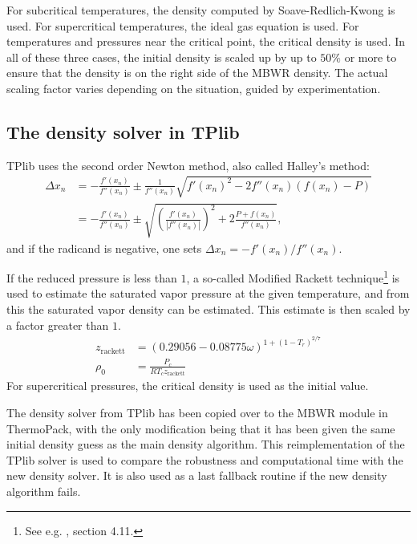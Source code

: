 \documentclass[english]{../thermomemo/thermomemo}
\newcommand{\lp}{\left(}
\newcommand{\rp}{\right)}
\numberwithin{equation}{section}
\begin{document}
For subcritical temperatures, the density computed by
Soave-Redlich-Kwong is used. For supercritical temperatures, the ideal
gas equation is used. For temperatures and pressures near the critical
point, the critical density is used. In all of these three cases, the
initial density is scaled up by up to $50\%$ or more to ensure that the density is on the right side of the MBWR density. The actual scaling factor varies depending on the situation, guided by experimentation.

\subsection{The density solver in TPlib} \label{tplibSolver}
TPlib uses the second order Newton method, also called Halley's method:
\begin{align*}
  \Delta x_n &= -\frac{f'(x_n)}{f''(x_n)} \pm \frac{1}{f''(x_n)} \sqrt{ f'(x_n)^2 - 2 f''(x_n) (f(x_n)-P) } \\
  &= -\frac{f'(x_n)}{f''(x_n)} \pm \sqrt{ \lp \frac{f'(x_n)}{|f''(x_n)|}
    \rp^2 + 2 \frac{P+f(x_n)}{f''(x_n) } },
\end{align*}
and if the radicand is negative, one sets $\Delta x_n = -f'(x_n) /
f''(x_n)$. 

If the reduced pressure is less than $1$, a so-called Modified Rackett
technique\footnote{See e.g. \cite{GasesAndLiquids01}, section 4.11.} is used to estimate the saturated vapor pressure at the given
temperature, and from this the saturated vapor density can be
estimated. This estimate is then scaled by a factor greater than
$1$.
\begin{align*}
  z_{\mathrm{rackett}} &= (0.29056 - 0.08775\omega)^{1 + (1 - T_r)^{2/7}} \\
  \rho_0 &= \frac{P_c}{R T_c z_{\mathrm{rackett}}}
\end{align*}
For supercritical pressures, the critical density is used
as the initial value. 

The density solver from TPlib has been copied over to the MBWR module
in ThermoPack, with the only modification being that it has been given
the same initial density guess as the main density algorithm. This
reimplementation of the TPlib solver is used to compare the
robustness and computational time with the new density solver. It is
also used as a last fallback routine if the new density algorithm
fails.
\end{document}
